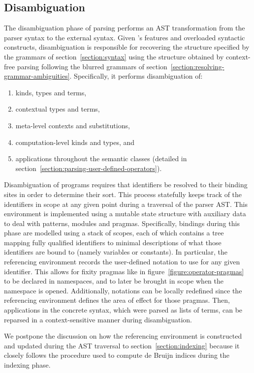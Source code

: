 \subsection{Disambiguation}

The disambiguation phase of parsing performs an \ac{AST} transformation from the parser syntax to the external syntax.
Given \Beluga's features and overloaded syntactic constructs, disambiguation is responsible for recovering the structure specified by the grammars of section~\ref{section:syntax} using the structure obtained by context-free parsing following the blurred grammars of section~\ref{section:resolving-grammar-ambiguities}.
Specifically, it performs disambiguation of:
\begin{enumerate}
\item \LF kinds, types and terms,
\item contextual \LF types and terms,
\item meta-level contexts and substitutions,
\item computation-level kinds and types, and
\item applications throughout the semantic classes (detailed in section~\ref{section:parsing-user-defined-operators}).
\end{enumerate}

Disambiguation of \Beluga programs requires that identifiers be resolved to their binding sites in order to determine their sort.
This process statefully keeps track of the identifiers in scope at any given point during a traversal of the parser \ac{AST}.
This environment is implemented using a mutable state structure with auxiliary data to deal with patterns, modules and pragmas.
Specifically, bindings during this phase are modelled using a stack of scopes, each of which contains a tree mapping fully qualified identifiers to minimal descriptions of what those identifiers are bound to (namely variables or constants).
In particular, the referencing environment records the user-defined notation to use for any given identifier.
This allows for fixity pragmas like in figure~\ref{figure:operator-pragmas} to be declared in namespaces, and to later be brought in scope when the namespace is opened.
Additionally, notations can be locally redefined since the referencing environment defines the area of effect for those pragmas.
Then, applications in the concrete syntax, which were parsed as lists of terms, can be reparsed in a context-sensitive manner during disambiguation.

We postpone the discussion on how the referencing environment is constructed and updated during the \ac{AST} traversal to section~\ref{section:indexing} because it closely follows the procedure used to compute de Bruijn indices during the indexing phase.

